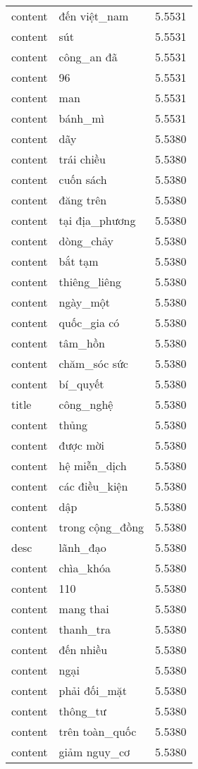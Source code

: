 \documentclass{article}
\begin{document}
\begin{tabular}{lll}
content & đến việt\_nam & 5.5531\\
content & sút & 5.5531\\
content & công\_an đã & 5.5531\\
content & 96 & 5.5531\\
content & man & 5.5531\\
content & bánh\_mì & 5.5531\\
content & dãy & 5.5380\\
content & trái chiều & 5.5380\\
content & cuốn sách & 5.5380\\
content & đăng trên & 5.5380\\
content & tại địa\_phương & 5.5380\\
content & dòng\_chảy & 5.5380\\
content & bắt tạm & 5.5380\\
content & thiêng\_liêng & 5.5380\\
content & ngày\_một & 5.5380\\
content & quốc\_gia có & 5.5380\\
content & tâm\_hồn & 5.5380\\
content & chăm\_sóc sức & 5.5380\\
content & bí\_quyết & 5.5380\\
title & công\_nghệ & 5.5380\\
content & thủng & 5.5380\\
content & được mời & 5.5380\\
content & hệ miễn\_dịch & 5.5380\\
content & các điều\_kiện & 5.5380\\
content & dập & 5.5380\\
content & trong cộng\_đồng & 5.5380\\
desc & lãnh\_đạo & 5.5380\\
content & chìa\_khóa & 5.5380\\
content & 110 & 5.5380\\
content & mang thai & 5.5380\\
content & thanh\_tra & 5.5380\\
content & đến nhiều & 5.5380\\
content & ngại & 5.5380\\
content & phải đối\_mặt & 5.5380\\
content & thông\_tư & 5.5380\\
content & trên toàn\_quốc & 5.5380\\
content & giảm nguy\_cơ & 5.5380\\

\end{tabular}
\end{document}
